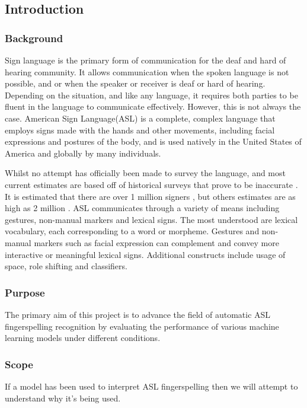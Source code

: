 \subsection{Introduction}
\subsubsection{Background}

Sign language is the primary form of communication for the deaf and hard of hearing community. It allows communication when the spoken language is not possible, and or when the speaker or receiver is deaf or hard of hearing.
Depending on the situation, and like any language, it requires both parties to be fluent in the language to communicate effectively. However, this is not always the case. American Sign Language(ASL) is a complete, complex language that employs signs made with the hands and other movements, including facial expressions and postures of the body, and is used natively in the
United States of America and globally by many individuals.

Whilst no attempt has officially been made to survey the language, and most current estimates are based off of historical surveys that prove to be inaccurate \cite{mitchellHowManyPeople2006}. It is estimated that there are over 1 million signers \cite{ethnologueAmericanSignLanguage2023}, but others estimates are as high as 2 million \cite{mitchellHowManyPeople2006}.
ASL communicates through a variety of means including gestures, non-manual markers and lexical signs. The most understood are lexical vocabulary, each corresponding to a word or morpheme. Gestures and non-manual markers such as facial expression can complement and convey more interactive or meaningful lexical signs. Additional constructs include usage of space, role shifting and classifiers.

\subsubsection{Purpose}

The primary aim of this project is to advance the field of automatic ASL fingerspelling recognition by evaluating the performance of various machine learning models under different conditions. 
\subsubsection{Scope}

If a model has been used to interpret ASL fingerspelling then we will attempt to understand why it's being used.

